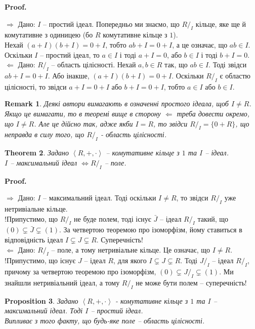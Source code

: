 \documentclass[a4paper, 10pt]{article}
\makeatletter
\def\rightproof{$\boxed{\Rightarrow}$ }
\def\leftproof{$\boxed{\Leftarrow}$ }
\theoremstyle{theoremdd}
\newtheorem{theorem}{Theorem}[subsection]
\theoremstyle{theoremdd}
\theoremstyle{theoremdd}
\theoremstyle{theoremdd}
\theoremstyle{theoremdd}
\theoremstyle{theoremdd}
\theoremstyle{theoremdd}
\theoremstyle{theoremdd}
\theoremstyle{theoremdd}
\newtheorem{proposition}[theorem]{Proposition}
\theoremstyle{theoremdd}
\theoremstyle{theoremdd}
\newtheorem{remark}[theorem]{Remark}
\theoremstyle{theoremdd}
\theoremstyle{theoremdd}
\theoremstyle{theoremdd}
\theoremstyle{theoremdd}
\renewenvironment{proof}[1][Proof.\\]{\par
\pushQED{\hfill \qed}%
\normalfont \topsep6\p@\@plus6\p@\relax
\trivlist
\item\relax
{\bfseries
#1\@addpunct{.}}\hspace\labelsep\ignorespaces
}{%
\popQED\endtrivlist\@endpefalse
}
\makeatother
\begin{document}
\begin{proof}
\rightproof Дано: $I$ -- простий ідеал. Попередньо ми знаємо, що $R/_I$ кільце, яке ще й комутативне з одиницею (бо $R$ комутативне кільце з $1$). \\
Нехай $(a+I)(b+I) = 0+I$, тобто $ab + I = 0+I$, а це означає, що $ab \in I$. Оскільки $I$ -- простий ідеал, то $a \in I$ і тоді $a+I = 0$, або $b \in I$ і тоді $b+I = 0$.
\bigskip \\
\leftproof Дано: $R/_I$ -- область цілісності. Нехай $a,b \in R$ так, що $ab \in I$. Тоді звідси $ab + I = 0 + I$. Або інакше, $(a+I)(b+I) = 0+I$. Оскільки $R/_I$ є областю цілісності, то звідси $a+I=0+I$ або $b+I=0+I$, тобто $a \in I$ або $b \in I$.
\end{proof}

\begin{remark}
Деякі автори вимагають в означенні простого ідеала, щоб $I \neq R$. Якщо це вимагати, то в теоремі вище в сторону \leftproof треба довести окремо, що $I \neq R$. Але це дійсно так, адже якби $I = R$, то звідси $R/_{I} = \{0+R\}$, що неправда в силу того, що $R/_{I}$ - область цілісності.
\end{remark}

\begin{theorem}
Задано $\left< R,+,\cdot \right>$ -- комутативне кільце з $1$ та $I$ -- ідеал.\\
$I$ -- максимальний ідеал $\iff R/_I$ -- поле.
\end{theorem}

\begin{proof}
\rightproof Дано: $I$ -- максимальний ідеал. Тоді оскільки $I \neq R$, то звідси $R/_I$ уже нетривіальне кільце.\\
!Припустимо, що $R/_I$ не буде полем, тоді існує $\bar{J}$ -- ідеал $R/_I$ такий, що $(0) \subsetneq \bar{J} \subsetneq (1)$. За четвертою теоремою про ізоморфізм, йому ставиться в відповідність ідеал $I \subsetneq J \subsetneq R$. Суперечність!
\bigskip \\
\leftproof Дано: $R/_I$ -- поле, а тому нетривіальне кільце. Це означає, що $I \neq R$.\\
!Припустимо, що існує $J$ -- ідеал $R$, для якого $I \subsetneq J \subsetneq R$. Тоді $J/_I$ -- ідеал $R/_I$, причому за четвертою теоремою про ізоморфізм, $(0) \subsetneq J/_I \subsetneq (1)$. Ми знайшли нетривіальний ідеал, а тому $R/_I$ не може бути полем -- суперечність!
\end{proof}

\begin{proposition}
Задано $\left< R,+,\cdot\right>$ - комутативне кільце з $1$ та $I$ -- максимальний ідеал. Тоді $I$ -- простий ідеал.\\
\textit{Випливає з того факту, що будь-яке поле -- область цілісності.}
\end{proposition}
\end{document}
